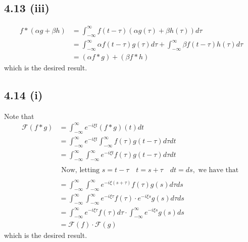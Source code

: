 \documentclass[letterpaper,12pt]{article}
\theoremstyle{definition}
\begin{document}
\subsection*{4.13 (iii)}
    \begin{align*}
    f*(\alpha g + \beta h) &= \int^{\infty}_{-\infty} f(t - \tau) (\alpha g(\tau) + \beta h(\tau)) d\tau \\
    &= \int^{\infty}_{-\infty} \alpha f(t - \tau) g(\tau) d\tau + \int^{\infty}_{-\infty} \beta f(t - \tau) h(\tau) d\tau \\
    &= (\alpha f * g) + (\beta f * h)    
    \end{align*}
        which is the desired result.



\subsection*{4.14 (i)}
Note that
        \begin{align*}
            \mathscr{F}(f*g) &= \int_{-\infty}^\infty  e^{-i \xi t} (f*g)(t) dt \\
            & =   \int_{-\infty}^\infty e^{-i \xi t} \int_{-\infty}^\infty f(\tau) g(t-\tau)d\tau dt \\
            & = \int_{-\infty}^\infty \int_{-\infty}^\infty e^{-i \xi t} f(\tau) g(t-\tau) d\tau dt \\\\
            & \text{ Now, letting }s = t - \tau\quad t = s+\tau \quad dt = ds, \text{ we have that } \\\\
            & = \int_{-\infty}^\infty \int_{-\infty}^\infty e^{-i \xi (s+\tau)} f(\tau) g(s) d\tau ds \\
            & = \int_{-\infty}^\infty \int_{-\infty}^\infty e^{-i \xi \tau}f(\tau) \cdot e^{-i \xi s} g(s) d\tau ds \\
            & = \int_{-\infty}^\infty e^{-i \xi \tau} f(\tau) d\tau \cdot \int_{-\infty}^\infty  e^{-i\xi s } g(s)ds \\
            & = \mathscr{F}(f) \cdot \mathscr{F}(g)
        \end{align*}
        which is the desired result.
\end{document}

